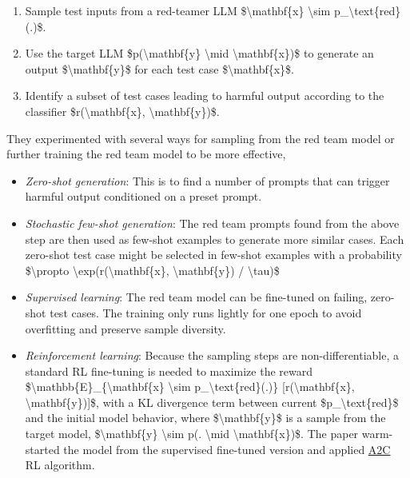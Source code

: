 \begin{enumerate}
\tightlist
\item
  Sample test inputs from a red-teamer LLM \$\textbackslash mathbf\{x\} \textbackslash sim p\_\textbackslash text\{red\}(.)\$.
\item
  Use the target LLM \$p(\textbackslash mathbf\{y\} \textbackslash mid \textbackslash mathbf\{x\})\$ to generate an output \$\textbackslash mathbf\{y\}\$ for each test case \$\textbackslash mathbf\{x\}\$.
\item
  Identify a subset of test cases leading to harmful output according to the classifier \$r(\textbackslash mathbf\{x\}, \textbackslash mathbf\{y\})\$.
\end{enumerate}

They experimented with several ways for sampling from the red team model or further training the red team model to be more effective,

\begin{itemize}
\tightlist
\item
  \emph{Zero-shot generation}: This is to find a number of prompts that can trigger harmful output conditioned on a preset prompt.
\item
  \emph{Stochastic few-shot generation}: The red team prompts found from the above step are then used as few-shot examples to generate more similar cases. Each zero-shot test case might be selected in few-shot examples with a probability \$\textbackslash propto \textbackslash exp(r(\textbackslash mathbf\{x\}, \textbackslash mathbf\{y\}) / \textbackslash tau)\$
\item
  \emph{Supervised learning}: The red team model can be fine-tuned on failing, zero-shot test cases. The training only runs lightly for one epoch to avoid overfitting and preserve sample diversity.
\item
  \emph{Reinforcement learning}: Because the sampling steps are non-differentiable, a standard RL fine-tuning is needed to maximize the reward \$\textbackslash mathbb\{E\}\_\{\textbackslash mathbf\{x\} \textbackslash sim p\_\textbackslash text\{red\}(.)\} {[}r(\textbackslash mathbf\{x\}, \textbackslash mathbf\{y\}){]}\$, with a KL divergence term between current \$p\_\textbackslash text\{red\}\$ and the initial model behavior, where \$\textbackslash mathbf\{y\}\$ is a sample from the target model, \$\textbackslash mathbf\{y\} \textbackslash sim p(. \textbackslash mid \textbackslash mathbf\{x\})\$. The paper warm-started the model from the supervised fine-tuned version and applied \href{https://lilianweng.github.io/posts/2018-04-08-policy-gradient/\#a2c}{A2C} RL algorithm.
\end{itemize}

